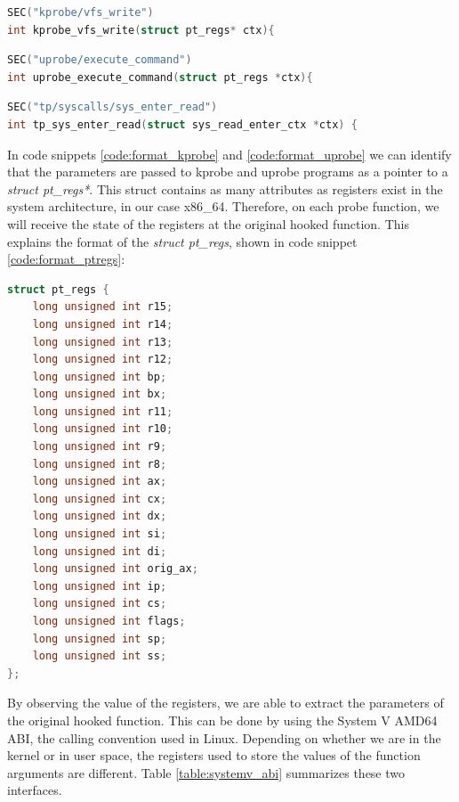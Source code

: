 \documentclass[12pt]{report} %
\begin{document}
\begin{lstlisting}[language=C, caption={Probe function for a kprobe on the kernel function vfs\_write.}, label={code:format_kprobe}]
SEC("kprobe/vfs_write")
int kprobe_vfs_write(struct pt_regs* ctx){
\end{lstlisting}

\begin{lstlisting}[language=C, caption={Probe function for an uprobe, execute\_command is defined from user space.}, label={code:format_uprobe}]
SEC("uprobe/execute_command")
int uprobe_execute_command(struct pt_regs *ctx){
\end{lstlisting}

\begin{lstlisting}[language=C, caption={Probe function for a tracepoint on the start of the syscall sys\_read.}, label={code:format_tracepoint}]
SEC("tp/syscalls/sys_enter_read") 
int tp_sys_enter_read(struct sys_read_enter_ctx *ctx) { 
\end{lstlisting}

In code snippets \ref{code:format_kprobe} and \ref{code:format_uprobe} we can identify that the parameters are passed to kprobe and uprobe programs as a pointer to a \textit{struct pt\_regs*}. This struct contains as many attributes as registers exist in the system architecture, in our case x86\_64. Therefore, on each probe function, we will receive the state of the registers at the original hooked function. This explains the format of the \textit{struct pt\_regs}, shown in code snippet \ref{code:format_ptregs}:

\begin{lstlisting}[language=C, caption={Format of struct pt\_regs.}, label={code:format_ptregs}]
struct pt_regs {
	long unsigned int r15;
	long unsigned int r14;
	long unsigned int r13;
	long unsigned int r12;
	long unsigned int bp;
	long unsigned int bx;
	long unsigned int r11;
	long unsigned int r10;
	long unsigned int r9;
	long unsigned int r8;
	long unsigned int ax;
	long unsigned int cx;
	long unsigned int dx;
	long unsigned int si;
	long unsigned int di;
	long unsigned int orig_ax;
	long unsigned int ip;
	long unsigned int cs;
	long unsigned int flags;
	long unsigned int sp;
	long unsigned int ss;
};
\end{lstlisting}

By observing the value of the registers, we are able to extract the parameters of the original hooked function. This can be done by using the System V AMD64 ABI\cite{8664_params_abi}, the calling convention used in Linux. Depending on whether we are in the kernel or in user space, the registers used to store the values of the function arguments are different. Table \ref{table:systemv_abi} summarizes these two interfaces. 
\end{document}

